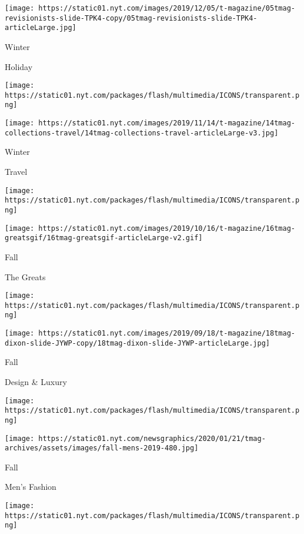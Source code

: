 \texttt{[image: https://static01.nyt.com/images/2019/12/05/t-magazine/05tmag-revisionists-slide-TPK4-copy/05tmag-revisionists-slide-TPK4-articleLarge.jpg]}

Winter

Holiday

\href{https://www.nytimes.com/issue/t-magazine/2019/11/04/ts-nov-17-travel-issue}{}

\texttt{[image: https://static01.nyt.com/packages/flash/multimedia/ICONS/transparent.png]}

\texttt{[image: https://static01.nyt.com/images/2019/11/14/t-magazine/14tmag-collections-travel/14tmag-collections-travel-articleLarge-v3.jpg]}

Winter

Travel

\href{https://www.nytimes.com/issue/t-magazine/2019/10/04/ts-oct-20-greats-issue}{}

\texttt{[image: https://static01.nyt.com/packages/flash/multimedia/ICONS/transparent.png]}

\texttt{[image: https://static01.nyt.com/images/2019/10/16/t-magazine/16tmag-greatsgif/16tmag-greatsgif-articleLarge-v2.gif]}

Fall

The Greats

\href{https://www.nytimes.com/issue/t-magazine/2019/09/09/ts-sept-22-design-luxury-issue}{}

\texttt{[image: https://static01.nyt.com/packages/flash/multimedia/ICONS/transparent.png]}

\texttt{[image: https://static01.nyt.com/images/2019/09/18/t-magazine/18tmag-dixon-slide-JYWP-copy/18tmag-dixon-slide-JYWP-articleLarge.jpg]}

Fall

Design \& Luxury

\href{https://www.nytimes.com/issue/t-magazine/2019/08/27/ts-sept-8-mens-fashion-issue}{}

\texttt{[image: https://static01.nyt.com/packages/flash/multimedia/ICONS/transparent.png]}

\texttt{[image: https://static01.nyt.com/newsgraphics/2020/01/21/tmag-archives/assets/images/fall-mens-2019-480.jpg]}

Fall

Men's Fashion

\href{https://www.nytimes.com/issue/t-magazine/2019/08/08/ts-aug-18-womens-fashion-issue}{}

\texttt{[image: https://static01.nyt.com/packages/flash/multimedia/ICONS/transparent.png]}

